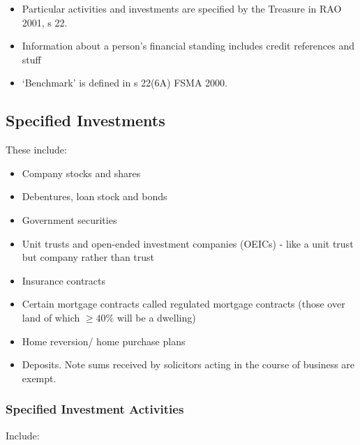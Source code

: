 \documentclass[
]{article}
\providecommand{\tightlist}{%
  \setlength{\itemsep}{0pt}\setlength{\parskip}{0pt}}
\begin{document}
\begin{itemize}
\tightlist
\item
  Particular activities and investments are specified by the Treasure in
  RAO 2001, s 22.
\item
  Information about a person's financial standing includes credit
  references and stuff
\item
  `Benchmark' is defined in s 22(6A) FSMA 2000.
\end{itemize}

\hypertarget{specified-investments}{%
\subsection{Specified Investments}\label{specified-investments}}

These include:

\begin{itemize}
\tightlist
\item
  Company stocks and shares
\item
  Debentures, loan stock and bonds
\item
  Government securities
\item
  Unit trusts and open-ended investment companies (OEICs) - like a unit
  trust but company rather than trust
\item
  Insurance contracts
\item
  Certain mortgage contracts called regulated mortgage contracts (those
  over land of which \(\geq 40\%\) will be a dwelling)
\item
  Home reversion/ home purchase plans
\item
  Deposits. Note sums received by solicitors acting in the course of
  business are exempt.
\end{itemize}

\hypertarget{specified-investment-activities}{%
\subsubsection{Specified Investment
Activities}\label{specified-investment-activities}}

Include:
\end{document}
